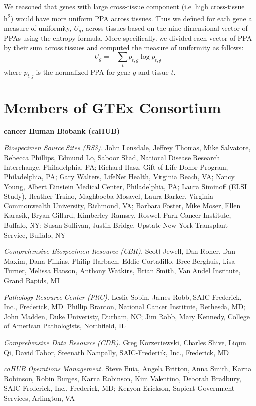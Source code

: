 \documentclass[10pt,letterpaper]{article}
\begin{document}
We reasoned that genes with large cross-tissue component (i.e. high cross-tissue h\textsuperscript{2}) would have more uniform PPA across tissues. Thus we defined for each gene a measure of uniformity, $U_g$, across tissues based on the nine-dimensional vector of PPAs using the entropy formula. More specifically, we divided each vector of PPA by their sum across tissues and computed the measure of uniformity as follows:
%
\[ U_g = -\sum_{t}p_{t,g} \log p_{t,g} \]
%
where \(p_{t,g}\) is the normalized PPA for gene $g$ and tissue $t$.


\section*{Members of GTEx Consortium}

{\bf cancer Human Biobank (caHUB)}

\textit{Biospecimen Source Sites (BSS).} John Lonsdale, Jeffrey Thomas, Mike Salvatore, Rebecca Phillips, Edmund Lo, Saboor Shad, National Disease Research Interchange, Philadelphia, PA; Richard Hasz, Gift of Life Donor Program, Philadelphia, PA; Gary Walters, LifeNet Health, Virginia Beach, VA; Nancy Young, Albert Einstein Medical Center, Philadelphia, PA; Laura Siminoff (ELSI Study), Heather Traino, Maghboeba Mosavel, Laura Barker, Virginia Commonwealth University, Richmond, VA; Barbara Foster, Mike Moser, Ellen Karasik, Bryan Gillard, Kimberley Ramsey, Roswell Park Cancer Institute, Buffalo, NY; Susan Sullivan, Justin Bridge, Upstate New York Transplant Service, Buffalo, NY

\textit{Comprehensive Biospecimen Resource (CBR).} Scott Jewell, Dan Roher, Dan Maxim, Dana Filkins, Philip Harbach, Eddie Cortadillo, Bree Berghuis, Lisa Turner, Melissa Hanson, Anthony Watkins, Brian Smith, Van Andel Institute, Grand Rapids, MI

\textit{Pathology Resource Center (PRC).} Leslie Sobin, James Robb, SAIC-Frederick, Inc., Frederick, MD; Phillip Branton, National Cancer Institute, Bethesda, MD; John Madden, Duke Univeristy, Durham, NC; Jim Robb, Mary Kennedy, College of American Pathologists, Northfield, IL

\textit{Comprehensive Data Resource (CDR).} Greg Korzeniewski, Charles Shive, Liqun Qi, David Tabor, Sreenath Nampally, SAIC-Frederick, Inc., Frederick, MD

\textit{caHUB Operations Management.} Steve Buia, Angela Britton, Anna Smith, Karna Robinson, Robin Burges, Karna Robinson, Kim Valentino, Deborah Bradbury, SAIC-Frederick, Inc., Frederick, MD; Kenyon Erickson, Sapient Government Services, Arlington, VA
\end{document}
